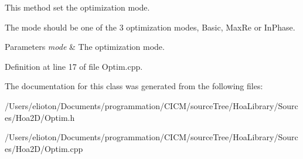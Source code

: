 This method set the optimization mode. 

The mode should be one of the 3 optimization modes, Basic, Max\-Re or In\-Phase.


\begin{DoxyParams}{Parameters}
{\em mode} & The optimization mode. \\
\hline
\end{DoxyParams}


Definition at line 17 of file Optim.\-cpp.



The documentation for this class was generated from the following files\-:\begin{DoxyCompactItemize}
\item 
/\-Users/elioton/\-Documents/programmation/\-C\-I\-C\-M/source\-Tree/\-Hoa\-Library/\-Sources/\-Hoa2\-D/Optim.\-h\item 
/\-Users/elioton/\-Documents/programmation/\-C\-I\-C\-M/source\-Tree/\-Hoa\-Library/\-Sources/\-Hoa2\-D/Optim.\-cpp\end{DoxyCompactItemize}
